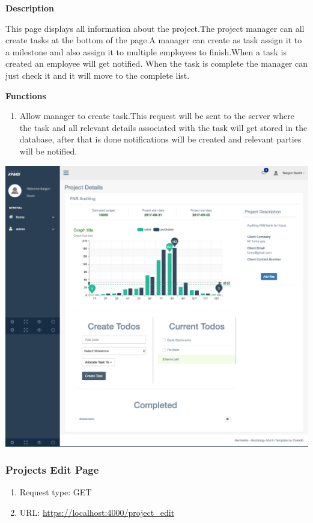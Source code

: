 \documentclass[a4paper,12pt]{article}
\begin{document}
				\textbf{Description}
				\begin{flushright}
				  This page displays all information about the project.The project manager can all create tasks at the bottom of the page.A manager can create as task assign it to a milestone and also assign it to multiple employees to finish.When a task is created an employee will get notified. When the task is complete the manager can just check it and it will move to the complete list.
				\end{flushright}
				
				\textbf{Functions}
				\begin{flushright}
				    \begin{enumerate}
				    	\item Allow manager to create task.This request will be sent to the server where the task and all relevant details associated with the task will get stored in the database, after that is done notifications will be created and relevant parties will be notified.
				     \end{enumerate}
				\end{flushright}
				\includegraphics[width=0.99\linewidth]{Images/manager_project_detail_view.png}
				
				
		 \subsubsection{Projects Edit Page}
		 		\begin{enumerate}
				 	\item Request type: GET
				 	\item URL: \url{https://localhost:4000/project_edit}
				 \end{enumerate}
				
\end{document}
